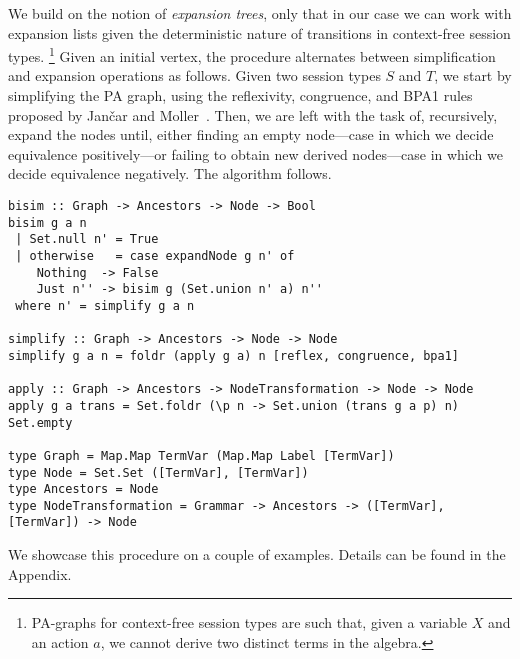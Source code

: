 We build on the notion of \emph{expansion trees}, only that in our
case we can work with expansion lists given the deterministic nature
of transitions in context-free session types.%
\footnote{PA-graphs for context-free session types are such that,
  given a variable $X$ and an action $a$, we cannot derive two
  distinct terms in the algebra.}
%
Given an initial vertex, the procedure alternates between
simplification and expansion operations as follows.
%
Given two session types $S$ and $T$, we start by simplifying the PA
graph, using the reflexivity, congruence, and BPA1 rules proposed by
Jan{\v{c}}ar and Moller~\cite{janvcar1999techniques}.
%
Then, we are left with the task of, recursively, expand the nodes
until, either finding an empty node---case in which we decide
equivalence positively---or failing to obtain new derived nodes---case
in which we decide equivalence negatively. The algorithm follows.
%
\begin{lstlisting}
bisim :: Graph -> Ancestors -> Node -> Bool
bisim g a n
 | Set.null n' = True
 | otherwise   = case expandNode g n' of
    Nothing  -> False
    Just n'' -> bisim g (Set.union n' a) n''
 where n' = simplify g a n

simplify :: Graph -> Ancestors -> Node -> Node
simplify g a n = foldr (apply g a) n [reflex, congruence, bpa1]

apply :: Graph -> Ancestors -> NodeTransformation -> Node -> Node
apply g a trans = Set.foldr (\p n -> Set.union (trans g a p) n) Set.empty

type Graph = Map.Map TermVar (Map.Map Label [TermVar])
type Node = Set.Set ([TermVar], [TermVar])
type Ancestors = Node
type NodeTransformation = Grammar -> Ancestors -> ([TermVar],[TermVar]) -> Node
\end{lstlisting}


We showcase this procedure on a couple of examples. Details can be found in the Appendix.

